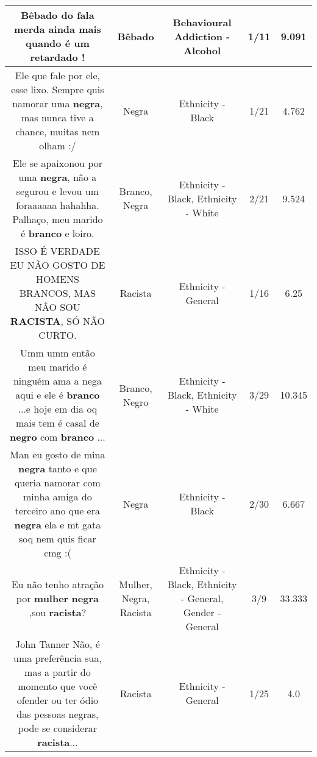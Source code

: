 \documentclass[11pt]{article}
\newlength\mylength
\begin{document}
\begin{center}
\begin{longtable}{|C{.65\mylength}|C{.30\mylength}|C{.12\mylength}|C{.12\mylength}|C{.12\mylength}|}
  \small Bêbado do fala merda ainda mais quando é um retardado !\normalsize   & Bêbado & Behavioural Addiction - Alcohol & 1/11 & 9.091 \\  \hline
  \small Ele que fale por ele, esse lixo. Sempre quis namorar uma \textbf{negra}, mas nunca tive a chance, muitas nem olham :/\normalsize   & Negra & Ethnicity - Black & 1/21 & 4.762 \\  \hline
  \small Ele se apaixonou por uma \textbf{negra}, não a segurou e levou um foraaaaaa hahahha. Palhaço, meu marido é \textbf{branco} e loiro.\normalsize   & Branco, Negra & Ethnicity - Black, Ethnicity - White & 2/21 & 9.524 \\  \hline
  \small ISSO É VERDADE EU NÃO GOSTO DE HOMENS BRANCOS, MAS NÃO SOU \textbf{RACISTA}, SÓ NÃO CURTO.\normalsize   & Racista & Ethnicity - General & 1/16 & 6.25 \\  \hline
  \small Umm umm então meu marido é ninguém ama a nega aqui e ele é \textbf{branco} ...e hoje em dia oq mais tem é casal de \textbf{negro} com \textbf{branco} ...\normalsize   & Branco, Negro & Ethnicity - Black, Ethnicity - White & 3/29 & 10.345 \\  \hline
  \small Man eu gosto de mina \textbf{negra} tanto e que queria namorar com minha amiga do terceiro ano que era \textbf{negra} ela e mt gata soq nem quis ficar cmg :(\normalsize   & Negra & Ethnicity - Black & 2/30 & 6.667 \\  \hline
  \small Eu não tenho atração por \textbf{mulher} \textbf{negra} ,sou \textbf{racista}?\normalsize   & Mulher, Negra, Racista & Ethnicity - Black, Ethnicity - General, Gender - General & 3/9 & 33.333 \\  \hline
  \small John Tanner Não, é uma preferência sua, mas a partir do momento que você ofender ou ter ódio das pessoas negras, pode se considerar \textbf{racista}...\normalsize   & Racista & Ethnicity - General & 1/25 & 4.0 \\  \hline

\end{longtable}
\end{center}
\end{document}
